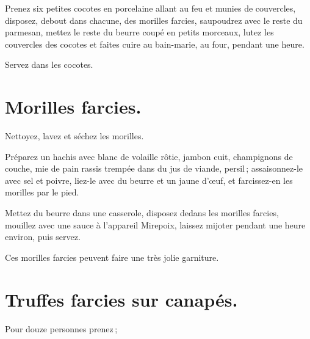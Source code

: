 Prenez six petites cocotes en porcelaine allant au feu et munies de couvercles,
disposez, debout dans chacune, des morilles farcies, saupoudrez avec le reste du
parmesan, mettez le reste du beurre coupé en petits morceaux, lutez les couvercles
des cocotes et faites cuire au bain-marie, au four, pendant une heure.

Servez dans les cocotes.

\section*{\centering Morilles farcies.}
{}

Nettoyez, lavez et séchez les morilles.

Préparez un hachis avec blanc de volaille rôtie, jambon cuit, champignons de
couche, mie de pain rassis trempée dans du jus de viande, persil ;
assaisonnez-le avec sel et poivre, liez-le avec du beurre et un jaune d'œuf, et
farcissez-en les morilles par le pied.

Mettez du beurre dans une casserole, disposez dedans les morilles farcies,
mouillez avec une sauce à l'appareil Mirepoix, laissez mijoter pendant une
heure environ, puis servez.

Ces morilles farcies peuvent faire une très jolie garniture.

\section*{\centering Truffes farcies sur canapés.}
{}

Pour douze personnes prenez ;

